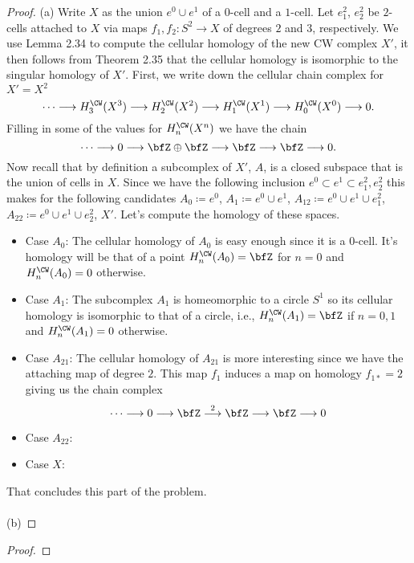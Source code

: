 \begin{proof}
(a) Write $X$ as the union $e^0\cup e^1$ of a $0$-cell and a $1$-cell. Let
$e^2_1$, $e^2_2$ be $2$-cells attached to $X$ via maps $f_1,f_2\colon
S^2\to X$ of degrees $2$ and $3$, respectively. We use Lemma 2.34 to
compute the cellular homology of the new CW complex $X'$, it then follows
from Theorem 2.35 that the cellular homology is isomorphic to the singular
homology of $X'$. First, we write down the cellular chain complex for
$X'=X^2$
\begin{equation}
\label{eq:cellular-chain-x}
\cdots\longrightarrow
H_3^\CW(X^3)\longrightarrow
H_2^\CW(X^2)\longrightarrow
H_1^\CW(X^1)\longrightarrow
H_0^\CW(X^0)\longrightarrow
0.
\end{equation}
Filling in some of the values for $H_n^\CW(X^n)$ we have the chain
\begin{equation}
\label{eq:cellular-chain-x-2}
\cdots\longrightarrow
0\longrightarrow
\bfZ\oplus\bfZ\longrightarrow
\bfZ\longrightarrow
\bfZ\longrightarrow
0.
\end{equation}
Now recall that by definition a subcomplex of $X'$, $A$, is a closed
subspace that is the union of cells in $X$. Since we have the following
inclusion $e^0\subset e^1\subset e_1^2,e_2^2$ this makes for the following
candidates $A_0\coloneqq e^0$, $A_1\coloneqq e^0\cup e^1$, $A_{12}\coloneqq
e^0\cup e^1\cup e_1^2$,
$A_{22}\coloneqq e^0\cup e^1\cup e_2^2$, $X'$. Let's compute the homology
of these spaces.
\begin{itemize}
\item Case $A_0$: The cellular homology of $A_0$ is easy enough since it
is a $0$-cell. It's homology will be that of a point $H_n^\CW(A_0)=\bfZ$
for $n=0$ and $H_n^\CW(A_0)=0$ otherwise.
\item Case $A_1$: The subcomplex $A_1$ is homeomorphic to a circle $S^1$ so
  its cellular homology is isomorphic to that of a circle, i.e.,
  $H_n^\CW(A_1)=\bfZ$ if $n=0,1$ and $H_n^\CW(A_1)=0$ otherwise.
\item Case $A_{21}$: The cellular homology of $A_{21}$ is more
  interesting since we have the attaching map of degree $2$. This map $f_1$
  induces a map on homology $f_{1*}=2$ giving us the chain complex
  \begin{equation}
  \label{eq:chain-complex-a-1-2}
  \cdots\longrightarrow
  0\longrightarrow
  \bfZ\overset{2}{\longrightarrow}
  \bfZ\longrightarrow
  \bfZ\longrightarrow
  0
  \end{equation}
\item Case $A_{22}$:
\item Case $X$:
\end{itemize}
That concludes this part of the problem.
\\\\
(b)
\end{proof}
\newpage

\begin{problem}
\end{problem}
\begin{proof}
\end{proof}

